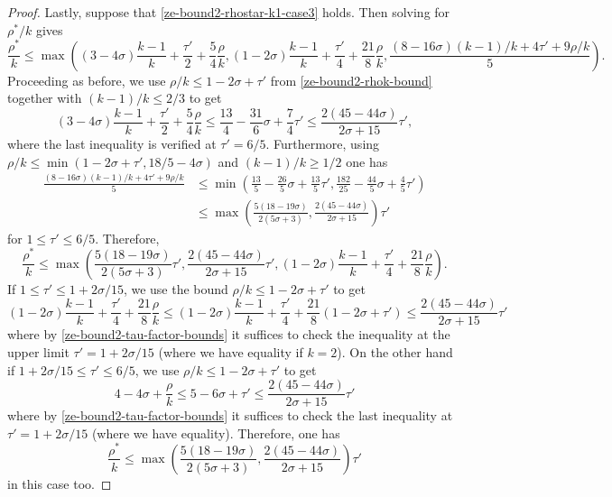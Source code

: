 \begin{proof}
Lastly, suppose that \eqref{ze-bound2-rhostar-k1-case3} holds. Then solving for $\rho^*/k$ gives
\[
\frac{\rho^*}{k} \le \max((3 - 4\sigma)\frac{k - 1}{k} + \frac{\tau'}{2} + \frac{5}{4}\frac{\rho}{k}, (1 - 2\sigma)\frac{k - 1}{k} + \frac{\tau'}{4} + \frac{21}{8}\frac{\rho}{k}, \frac{(8 - 16\sigma)(k - 1)/k + 4\tau' + 9\rho/k}{5}).
\]
Proceeding as before, we use $\rho/k \le 1 - 2\sigma + \tau'$ from \eqref{ze-bound2-rhok-bound} together with $(k - 1)/k \le 2/3$ to get
\[
(3 - 4\sigma)\frac{k - 1}{k} + \frac{\tau'}{2} + \frac{5}{4}\frac{\rho}{k} \le \frac{13}{4} - \frac{31}{6}\sigma + \frac{7}{4}\tau' \le \frac{2(45 - 44\sigma)}{2\sigma + 15}\tau',
\]
where the last inequality is verified at $\tau' = 6/5$. Furthermore, using $\rho/k \le \min(1 -2\sigma +\tau', 18/5-4\sigma)$ and $(k - 1)/k \ge 1/2$ one has
\begin{align*}
\frac{(8 - 16\sigma)(k - 1)/k + 4\tau' + 9\rho/k}{5} &\le \min\left(\frac{13}{5} - \frac{26}{5}\sigma + \frac{13}{5}\tau', \frac{182}{25} - \frac{44}{5}\sigma + \frac{4}{5}\tau'\right)\\
&\le \max\left(\frac{5(18-19\sigma)}{2(5\sigma+3)}, \frac{2(45 - 44\sigma)}{2\sigma + 15}\right)\tau'
\end{align*}
for $1 \le \tau' \le 6/5$. Therefore,
\[
\frac{\rho^*}{k} \le \max\left(\frac{5(18-19\sigma)}{2(5\sigma+3)}\tau', \frac{2(45 - 44\sigma)}{2\sigma + 15}\tau', (1 - 2\sigma)\frac{k - 1}{k} + \frac{\tau'}{4} + \frac{21}{8}\frac{\rho}{k}\right).
\]
If $1 \le \tau' \le 1 + 2\sigma /15$, we use the bound $\rho/k \le 1 - 2\sigma + \tau'$ to get
\[
(1 - 2\sigma)\frac{k - 1}{k} + \frac{\tau'}{4} + \frac{21}{8}\frac{\rho}{k} \le (1 - 2\sigma)\frac{k - 1}{k} + \frac{\tau'}{4} + \frac{21}{8}(1 - 2\sigma +\tau') \le \frac{2(45 - 44\sigma)}{2\sigma + 15}\tau'
\]
where by \eqref{ze-bound2-tau-factor-bounds} it suffices to check the inequality at the upper limit $\tau' = 1 + 2\sigma/15$ (where we have equality if $k = 2$).
On the other hand if $1 + 2\sigma/15 \le \tau' \le 6/5$, we use $\rho/k \le 1 - 2\sigma + \tau'$ to get
\[
4 - 4\sigma + \frac{\rho}{k} \le 5 - 6\sigma + \tau'\le \frac{2(45 - 44\sigma)}{2\sigma + 15}\tau'
\]
where by \eqref{ze-bound2-tau-factor-bounds} it suffices to check the last inequality at $\tau' = 1 + 2\sigma/15$ (where we have equality). Therefore, one has
\[
\frac{\rho^*}{k} \le \max\left(\frac{5(18 - 19\sigma)}{2(5\sigma + 3)}, \frac{2(45 - 44\sigma)}{2\sigma + 15}\right)\tau'
\]
in this case too.

\end{proof}

